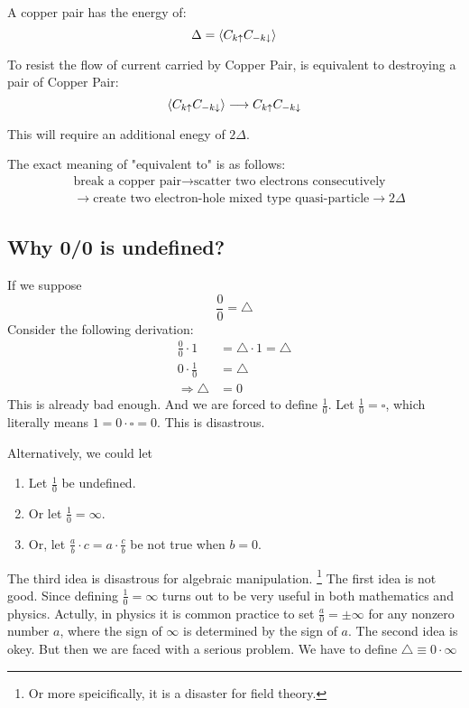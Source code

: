 \documentclass{article}
\numberwithin{equation}{subsection} %
\theoremstyle{definition}
\begin{document}
    A copper pair has the energy of:
    $$\Delta = \braket{C_{k \uparrow}C_{-k \downarrow} }$$
    
    To resist the flow of current carried by Copper Pair, is equivalent to destroying a pair of Copper Pair:
    $$ \braket{C_{k \uparrow}C_{-k \downarrow} } \longrightarrow C_{k \uparrow}C_{-k \downarrow}$$
    
    This will require an additional enegy of $2\Delta$.
    
    The exact meaning of "equivalent to" is as follows:
    \begin{align}
        & \text{break a copper pair} \longrightarrow 
        \text{scatter two electrons consecutively} 
        \nonumber\\ & \longrightarrow 
        \text{create two electron-hole mixed type quasi-particle} \longrightarrow 2\Delta \nonumber
    \end{align}

    \subsection{Why 0/0 is undefined?}
    If we suppose
    $$ \frac{0}{0}= \triangle $$
    Consider the following derivation:
    \begin{align}
	    \frac{0}{0} \cdot 1 &= \triangle \cdot 1 = \triangle \\
	    0 \cdot \frac{1}{0} &= \triangle\\
	    \Rightarrow \triangle &= 0
    \end{align}
    This is already bad enough. And we are forced to define $\frac{1}{0}$.
    Let $\frac{1}{0} = \square$, which literally means $1=0\cdot \square = 0$.
    This is disastrous.

    Alternatively, we could let
    \begin{enumerate}
	    \item Let $\frac{1}{0}$ be undefined.
	    \item Or let $\frac{1}{0} =
		    \infty$.
	    \item Or, let $\frac{a}{b}\cdot c= a\cdot \frac{c}{b}$ be not 
		    true when $b=0$.
    \end{enumerate}
    The third idea is disastrous for algebraic manipulation. \footnote{
    Or more speicifically, it is a disaster for field theory.
    }
    The first idea is not good. Since defining $\frac{1}{0}=\infty$ turns
    out to be very useful in both mathematics and physics. Actully, in
    physics it is common practice to set $\frac{a}{0}=\pm\infty$ for
    any nonzero number $a$, where the sign of $\infty$ is determined by 
    the sign of $a$.
    The second idea is okey. But then we are faced with a serious problem.
    We have to define $\triangle \equiv 0 \cdot \infty$
\end{document}
